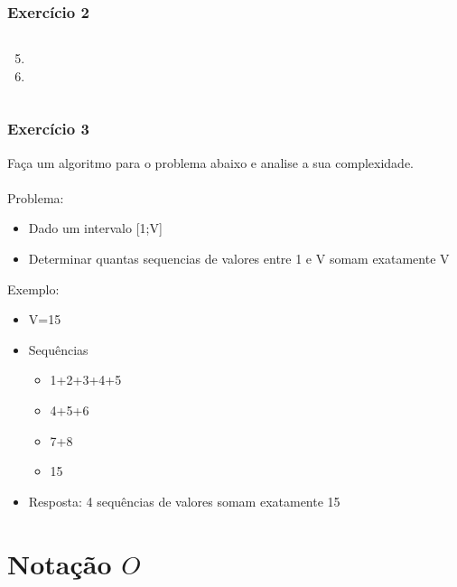 \documentclass[aspectratio=169]{beamer}
\begin{document}
\begin{frame}[fragile]\frametitle{Exercício 2}
\begin{columns}[T]
\begin{column}{0.5\linewidth}
\begin{enumerate}
	\setcounter{enumi}{4}
	\item {\scriptsize}
	\item {\scriptsize}
\end{enumerate}
\end{column}
\begin{column}{0.5\linewidth}
\end{column}
\end{columns}
\end{frame}

\begin{frame}\frametitle{Exercício 3}
Faça um algoritmo para o problema abaixo e analise a sua complexidade.\\
~\\
Problema:
\begin{itemize}
	\item Dado um intervalo [1;V]
	\item Determinar quantas sequencias de valores entre 1 e V somam exatamente V
\end{itemize}
Exemplo:
\begin{itemize}
	\item V=15
	\item Sequências
	\begin{itemize}
		\item 1+2+3+4+5
		\item 4+5+6
		\item 7+8
		\item 15
	\end{itemize}
	\item Resposta: 4 sequências de valores somam exatamente 15
\end{itemize}
\end{frame}

\section{Notação $O$}
\end{document}
